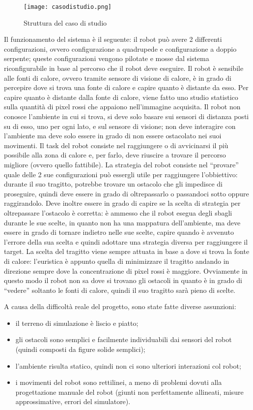 \documentclass[a4paper,titlepage]{book}
\begin{document}
\begin{figure}[!ht]
\centering
\texttt{[image: casodistudio.png]}
\caption{Struttura del caso di studio}\label{fig:casodistudio}
\end{figure}


Il funzionamento del sistema è il seguente: il robot può avere 2 differenti configurazioni, ovvero configurazione a quadrupede e configurazione a doppio serpente; queste configurazioni vengono pilotate e mosse dal sistema riconfigurabile in base al percorso che il robot deve eseguire. Il robot è sensibile alle fonti di calore, ovvero tramite sensore di visione di calore, è in grado di percepire dove si trova una fonte di calore e capire quanto è distante da esso. Per capire quanto è distante dalla fonte di calore, viene fatto uno studio statistico sulla quantità di pixel rossi che appaiono nell'immagine acquisita.
Il robot non conosce l'ambiente in cui si trova, si deve solo basare sui sensori di distanza posti su di esso, uno per ogni lato, e sul sensore di visione; non deve interagire con l'ambiente ma deve solo essere in grado di non essere ostacolato nei suoi movimenti. Il task del robot consiste nel raggiungere o di avvicinarsi il più possibile alla zona di calore e, per farlo, deve riuscire a trovare il percorso migliore (ovvero quello fattibile).
La strategia del robot consiste nel ``provare'' quale delle 2 sue configurazioni può essergli utile per raggiungere l'obbiettivo: durante il suo tragitto, potrebbe trovare un ostacolo che gli impedisce di proseguire, quindi deve essere in grado di oltrepassarlo o passandoci sotto oppure raggirandolo. Deve inoltre essere in grado di capire se la scelta di strategia per oltrepassare l'ostacolo è corretta: è ammesso che il robot esegua degli sbagli durante le sue scelte, in quanto non ha una mappatura dell'ambiente, ma deve essere in grado di tornare indietro nelle sue scelte, capire quando è avvenuto l'errore della sua scelta e quindi adottare una strategia diversa per raggiungere il target.
La scelta del tragitto viene sempre attuata in base a dove si trova la fonte di calore: l'euristica è appunto quella di minimizzare il tragitto andando in direzione sempre dove la concentrazione di pixel rossi è maggiore. Ovviamente in questo modo il robot non sa dove si trovano gli ostacoli in quanto è in grado di ``vedere'' soltanto le fonti di calore, quindi il suo tragitto sarà pieno di scelte.

A causa della difficoltà reale del progetto, sono state fatte diverse assunzioni:
\begin{itemize}
  \item il terreno di simulazione è liscio e piatto;
  \item gli ostacoli sono semplici e facilmente individuabili dai sensori del robot (quindi composti da figure solide semplici);
  \item l'ambiente risulta statico, quindi non ci sono ulteriori interazioni col robot;
  \item i movimenti del robot sono rettilinei, a meno di problemi dovuti alla progettazione manuale del robot (giunti non perfettamente allineati, misure approssimative, errori del simulatore).
\end{itemize}
\end{document}
